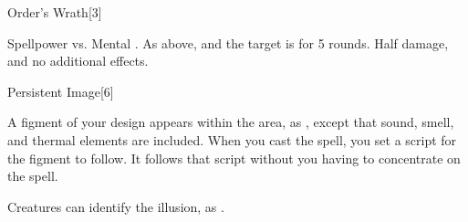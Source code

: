 
\begin{spellsection}{Order's Wrath}[3]
    \begin{spellheader}
    \end{spellheader}
    \begin{spellcontent}
        \begin{spelltargetinginfo}
        \end{spelltargetinginfo}
        \begin{spelleffects}
            \begin{spellattack}{Spellpower vs. Mental}
                \spellsuccess {}.
                \spellcritical As above, and the target is \immobilized for 5 rounds.
                \spellfailure Half damage, and no additional effects.
            \end{spellattack}
        \end{spelleffects}
    \end{spellcontent}
    \begin{spellfooter}
        \miscastrandom
    \end{spellfooter}
\end{spellsection}

\begin{spellsection}{Persistent Image}[6]
    \begin{spellheader}
    \end{spellheader}
    \begin{spellcontent}
        \begin{spelltargetinginfo}
        \end{spelltargetinginfo}
        \begin{spelleffects}
            \spelleffect A figment of your design appears within the area, as , except that sound, smell, and thermal elements are included. When you cast the spell, you set a script for the figment to follow. It follows that script without you having to concentrate on the spell.
            \spelldur \durmed \dismissable
        \end{spelleffects}
    \end{spellcontent}
    \begin{spellfooter}
        \spellnotes Creatures can identify the illusion, as .
        \miscastexplode
    \end{spellfooter}
\end{spellsection}

